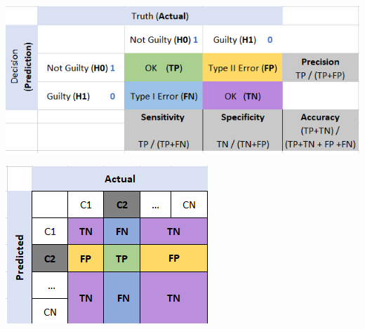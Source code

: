 \documentclass[letterpaper, 10.5pt,landscape]{article}
\begin{document}
\begin{multicols*}{3}
\begin{center}
    \begin{minipage}{\linewidth}
        \includegraphics[width=\textwidth]{figures/Confusion_Matrix_2.PNG}
    \end{minipage}
\end{center}

\begin{center}
    \begin{minipage}{0.56\linewidth}
        \includegraphics[width=\textwidth]{figures/confusion_matrix_multi_class.PNG}
    \end{minipage}
\end{center}




\end{multicols*}
\end{document}
